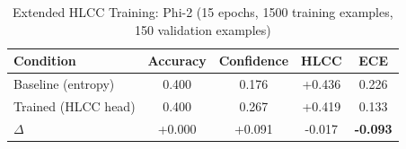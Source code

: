 \begin{table}[h]
\centering
\caption{Extended HLCC Training: Phi-2 (15 epochs, 1500 training examples, 150 validation examples)}
\begin{tabular}{lcccc}
\toprule
Condition & Accuracy & Confidence & HLCC & ECE \\
\midrule
Baseline (entropy) & 0.400 & 0.176 & +0.436 & 0.226 \\
Trained (HLCC head) & 0.400 & 0.267 & +0.419 & 0.133 \\
\midrule
$\Delta$ & +0.000 & +0.091 & -0.017 & \textbf{-0.093} \\
\bottomrule
\end{tabular}
\label{tab:extended_phi2}
\end{table}
